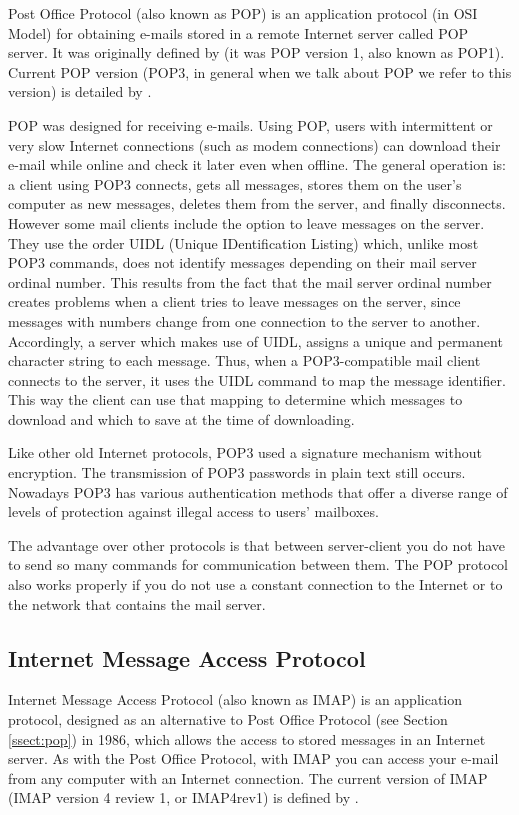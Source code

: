 Post Office Protocol (also known as POP) is an application protocol (in OSI Model) for obtaining e-mails stored in a remote Internet server called POP server. It was originally defined by \cite{rfc918} (it was POP version 1, also known as POP1). Current POP version (POP3, in general when we talk about POP we refer to this version) is detailed by \cite{rfc1939}.

POP was designed for receiving e-mails. Using POP, users with intermittent or very slow Internet connections (such as modem connections) can download their e-mail while online and check it later even when offline. The general operation is: a client using POP3 connects, gets all messages, stores them on the user's computer as new messages, deletes them from the server, and finally disconnects. However some mail clients include the option to leave messages on the server. They use the order UIDL (Unique IDentification Listing) which, unlike most POP3 commands, does not identify messages depending on their mail server ordinal number. This results from the fact that the mail server ordinal number creates problems when a client tries to leave messages on the server, since messages with numbers change from one connection to the server to another. Accordingly, a server which makes use of UIDL, assigns a unique and permanent character string to each message. Thus, when a POP3-compatible mail client connects to the server, it uses the UIDL command to map the message identifier. This way the client can use that mapping to determine which messages to download and which to save at the time of downloading.

Like other old Internet protocols, POP3 used a signature mechanism without encryption. The transmission of POP3 passwords in plain text still occurs. Nowadays POP3 has various authentication methods that offer a diverse range of levels of protection against illegal access to users' mailboxes.

The advantage over other protocols is that between server-client you do not have to send so many commands for communication between them. The POP protocol also works properly if you do not use a constant connection to the Internet or to the network that contains the mail server.

\subsection{Internet Message Access Protocol} \label{ssect:imap}

Internet Message Access Protocol (also known as IMAP) is an application protocol, designed as an alternative to Post Office Protocol (see Section \ref{ssect:pop}) in 1986, which allows the access to stored messages in an Internet server. As with the Post Office Protocol, with IMAP you can access your e-mail from any computer with an Internet connection. The current version of IMAP (IMAP version 4 review 1, or IMAP4rev1) is defined by \cite{rfc3501}.


